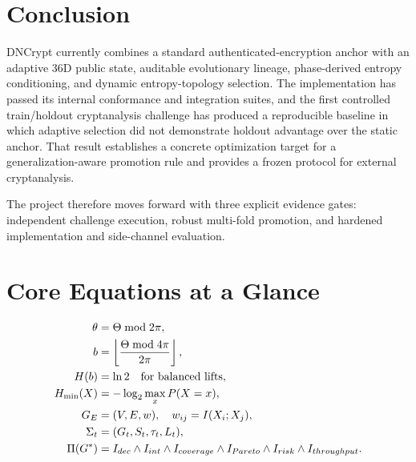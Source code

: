 \chapter{Conclusion}
DNCrypt currently combines a standard authenticated-encryption anchor with an adaptive 36D public state, auditable evolutionary lineage, phase-derived entropy conditioning, and dynamic entropy-topology selection. The implementation has passed its internal conformance and integration suites, and the first controlled train/holdout cryptanalysis challenge has produced a reproducible baseline in which adaptive selection did not demonstrate holdout advantage over the static anchor. That result establishes a concrete optimization target for a generalization-aware promotion rule and provides a frozen protocol for external cryptanalysis.

The project therefore moves forward with three explicit evidence gates: independent challenge execution, robust multi-fold promotion, and hardened implementation and side-channel evaluation.

\appendix
\chapter{Core Equations at a Glance}
\begin{align}
\theta &= \Theta\bmod 2\pi,\\
b &= \left\lfloor\frac{\Theta\bmod4\pi}{2\pi}\right\rfloor,\\
H(b) &= \ln2\quad\text{for balanced lifts},\\
H_{\min}(X) &= -\log_2\max_x P(X=x),\\
G_E &= (V,E,w),\quad w_{ij}=I(X_i;X_j),\\
\Sigma_t &= (G_t,S_t,\tau_t,L_t),\\
\Pi(G^*) &= I_{dec}\land I_{int}\land I_{coverage}\land I_{Pareto}\land I_{risk}\land I_{throughput}.
\end{align}

